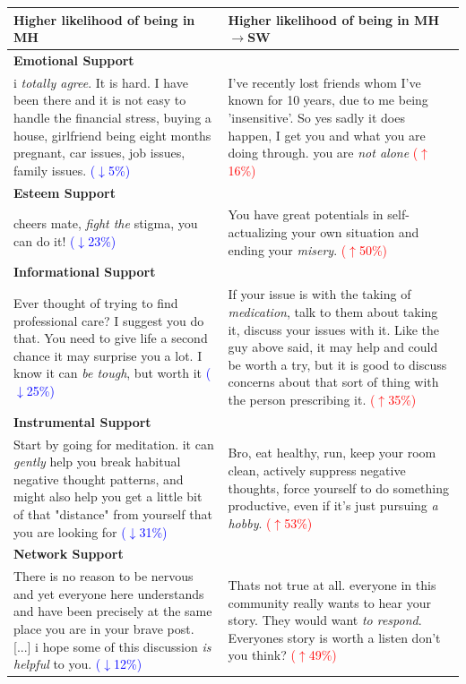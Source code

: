 \begin{table}
\small
\noindent\begin{tabularx}{\textwidth}{XX}
\toprule
Higher likelihood of being in MH &  Higher likelihood of being in MH$\rightarrow$SW\\ 
\midrule
\rowcolor{gray}
\textbf{Emotional Support}&\\
i \textit{totally agree}. It is hard. I have been there and it is not easy to handle the financial stress, buying a house, girlfriend being eight months pregnant, car issues, job issues, family issues. \textcolor{blue}{($\downarrow$5\%)}& I’ve recently lost friends whom I’ve known for 10 years, due to me being 'insensitive'. So yes sadly it does happen, I get you and what you are doing through. you are \textit{not alone}  \textcolor{red}{($\uparrow$16\%)}\\
\rowcolor{gray}
\textbf{Esteem Support}&\\
cheers mate, \textit{fight the} stigma, you can do it! \textcolor{blue}{($\downarrow$23\%)} & You have great potentials in self-actualizing your own situation and ending your \textit{misery}.  \textcolor{red}{($\uparrow$50\%)} \\
\rowcolor{gray}
\textbf{Informational Support}&\\
Ever thought of trying to find professional care? I suggest you do that. You need to give life a second chance it may surprise you a lot. I know it can \textit{be tough}, but worth it \textcolor{blue}{($\downarrow$25\%)}& If your issue is with the taking of \textit{medication}, talk to them about taking it, discuss your issues with it. Like the guy above said, it may help and could be worth a try, but it is good to discuss concerns about that sort of thing with the person prescribing it. \textcolor{red}{($\uparrow$35\%)}\\
\rowcolor{gray}
\textbf{Instrumental Support}&\\
Start by going for meditation. it can \textit{gently} help you break habitual negative thought patterns, and might also help you get a little bit of that "distance" from yourself that you are looking for \textcolor{blue}{($\downarrow$31\%)}& Bro, eat healthy, run, keep your room clean, actively suppress negative thoughts, force yourself to do something productive, even if it's just pursuing \textit{a hobby}. \textcolor{red}{($\uparrow$53\%)}\\
\rowcolor{gray}
\textbf{Network Support}&\\
There is no reason to be nervous and yet everyone here understands and have been precisely at the same place you are in your brave post. [...] i hope some of this discussion \textit{is helpful} to you. \textcolor{blue}{($\downarrow$12\%)} & Thats not true at all. everyone in this community really wants to hear your story. They would want \textit{to respond}. Everyones story is worth a listen don't you think? \textcolor{red}{($\uparrow$49\%)}\\

\end{tabularx}
\end{table}
